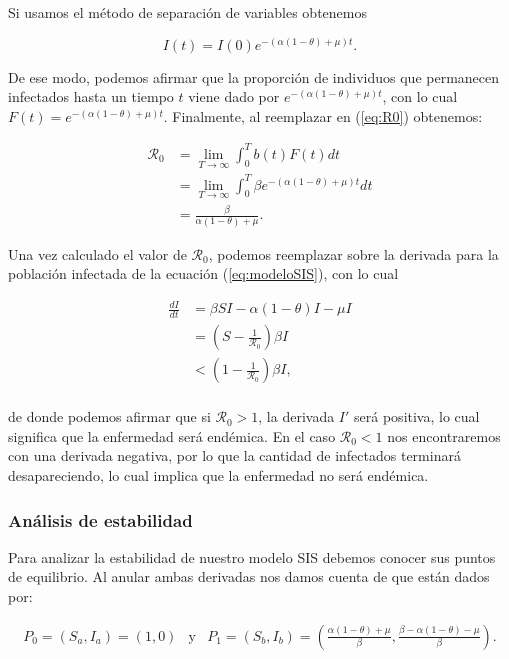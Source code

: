 Si usamos el método de separación de variables obtenemos

\begin{equation}\label{eq:Infectados en el tiempo}
I(t) = I(0)e^{-(\alpha(1-\theta)+\mu)t}.
\end{equation}

De ese modo, podemos afirmar que la proporción de individuos que permanecen infectados hasta un tiempo $t$ viene dado por $e^{-(\alpha(1-\theta)+\mu)t}$, con lo cual $F(t)=e^{-(\alpha(1-\theta)+\mu)t}$. Finalmente, al reemplazar en (\ref{eq:R0}) obtenemos:

\begin{align*}
\mathcal{R}_0 &= \lim_{T\to\infty}\int_0^T b(t)F(t) dt \\
&= \lim_{T\to\infty}\int_0^T \beta e^{-(\alpha(1-\theta)+\mu)t} dt\\
&= \frac{\beta}{\alpha(1-\theta)+\mu}.
\end{align*}

Una vez calculado el valor de $\mathcal{R}_0$, podemos reemplazar sobre la derivada para la población infectada de la ecuación (\ref{eq:modeloSIS}), con lo cual

\begin{align*}
    \frac{dI}{dt} &= \beta SI - \alpha(1-\theta)I - \mu I \\
    &= \left(S-\frac{1}{\mathcal{R}_0}\right)\beta I \\
    &< \left(1-\frac{1}{\mathcal{R}_0}\right)\beta I, \\
\end{align*}

de donde podemos afirmar que si $\mathcal{R}_0>1$, la derivada $I'$ será positiva, lo cual significa que la enfermedad será endémica. En el caso $\mathcal{R}_0<1$ nos encontraremos con una derivada negativa, por lo que la cantidad de infectados terminará desapareciendo, lo cual implica que la enfermedad no será endémica.

\subsubsection{Análisis de estabilidad}

Para analizar la estabilidad de nuestro modelo SIS debemos conocer sus puntos de equilibrio. Al anular ambas derivadas nos damos cuenta de que están dados por:

$$\begin{array}{ccc}
    P_0=(S_a,I_a)=(1,0) & \text{y} & P_1=(S_b,I_b)=\left(\frac{\alpha(1-\theta)+\mu}{\beta},\frac{\beta-\alpha(1-\theta)-\mu}{\beta}\right).
\end{array}$$

